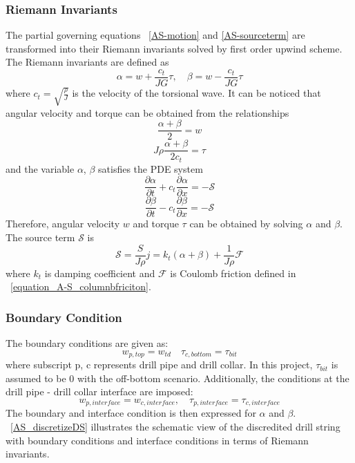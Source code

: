\subsubsection{Riemann Invariants}
The partial governing equations \equationname~\ref{AS-motion} and \ref{AS-sourceterm} are transformed into their Riemann invariants solved by first order upwind scheme. The Riemann invariants are defined as
\begin{equation}\label{AS-Riemann}
  \alpha = w + \frac{c_t}{JG}\tau, \quad \beta=w-\frac{c_t}{JG}\tau
\end{equation}
where $c_t = \sqrt{\frac{\rho}{J}}$ is the velocity of the torsional wave. It can be noticed that angular velocity and torque can be obtained from the relationships
\begin{equation}\label{equation_Riemann_relation1}
  \frac{\alpha + \beta}{2} = w
\end{equation}
\begin{equation}\label{equation_Riemann_relation2}
  J \rho \frac{\alpha + \beta}{2c_t} = \tau
\end{equation}
and the variable $\alpha$, $\beta$ satisfies the PDE system
\begin{equation}\label{AS-Riemann_alpha}
  \frac{\partial \alpha}{\partial t} + c_t\frac{\partial \alpha}{\partial x} = -\mathcal{S}
\end{equation}
\begin{equation}\label{AS-Riemann_beta}
  \frac{\partial \beta}{\partial t} - c_t\frac{\partial \beta}{\partial x} = -\mathcal{S}
\end{equation}
Therefore, angular velocity $w$ and torque $\tau$ can be obtained by solving $\alpha$ and $\beta$.
The source term $\mathcal{S}$ is
\begin{equation}\label{AS-source}
  \mathcal{S} = \frac{S}{J \rho} j= k_t(\alpha + \beta) + \frac{1}{J \rho} \mathcal{F}
\end{equation}
where $k_t$ is damping coefficient and $\mathcal{F}$ is Coulomb friction defined in \equationname~\ref{equation_A-S_columnbfriciton}.
\subsubsection{Boundary Condition}
The boundary conditions are given as:
\begin{equation}\label{AS-BC}
  w_{p,top} = w_{td} \quad \tau_{c,bottom} = \tau_{bit}
\end{equation}
where subscript p, c represents drill pipe and drill collar. In this project, $\tau_{bit}$ is assumed to be 0 with the off-bottom scenario.
Additionally, the conditions at the drill pipe - drill collar interface are imposed:
\begin{equation}\label{AS-interface}
  w_{p,interface} = w_{c,interface}, \quad \tau_{p,interface} = \tau_{c,interface}
\end{equation}
The boundary and interface condition is then expressed for $\alpha$ and $\beta$. \figurename~\ref{AS_discretizeDS} illustrates the schematic view of the discredited drill string with boundary conditions and interface conditions in terms of Riemann invariants.

